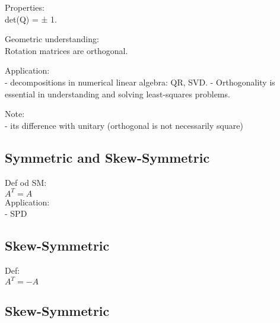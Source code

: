 \documentclass{article}
\begin{document}
\medskip
\noindent
Properties:\\
det(Q) = ± 1. 

\medskip
\noindent
Geometric understanding:\\
Rotation matrices are orthogonal.

\medskip
\noindent
Application:\\
- decompositions in numerical linear algebra: QR, SVD.
- Orthogonality is essential in understanding and solving least-squares problems.

\medskip
\noindent
Note: \\
- its difference with unitary (orthogonal is not necessarily square)\\


\subsection*{Symmetric and Skew-Symmetric}
Def od SM:\\
$A^T = A$\\

\noindent
Application:\\
- SPD

\subsection{Skew-Symmetric}
Def: \\
$A^T = -A$\\

\subsection*{Skew-Symmetric}
\end{document}
